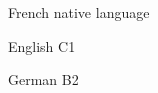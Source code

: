 

\begin{cvpairs}

  
\cvpair
    {French} %
    {native language} %


\cvpair
    {English} %
    {C1} %


\cvpair
    {German} %
    {B2} %

\end{cvpairs}